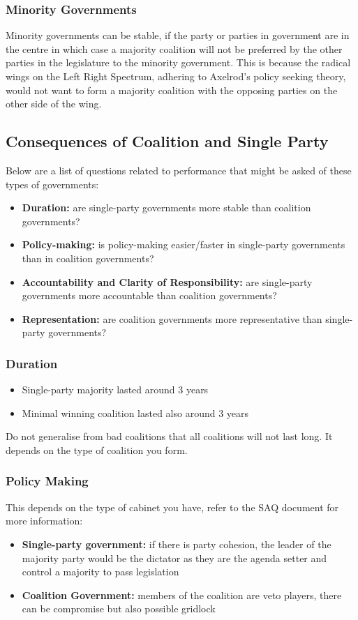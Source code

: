 \documentclass[12pt, letterpaper]{article}
\begin{document}
\subsubsection{Minority Governments}
Minority governments can be stable, if the party or parties in government are in the centre in which case a majority coalition will not be preferred by the other parties in the legislature to the minority government. This is because the radical wings on the Left Right Spectrum, adhering to Axelrod's policy seeking theory, would not want to form a majority coalition with the opposing parties on the other side of the wing.

\subsection{Consequences of Coalition and Single Party}
Below are a list of questions related to performance that might be asked of these types of governments:
\begin{itemize}
	\item \textbf{Duration:} are single-party governments more stable than coalition governments?
	\item \textbf{Policy-making:} is policy-making easier/faster in single-party governments than in coalition governments?
	\item \textbf{Accountability and Clarity of Responsibility:} are single-party governments more accountable than coalition governments?
	\item \textbf{Representation:} are coalition governments more representative than single-party governments?
\end{itemize}

\subsubsection{Duration}
\begin{itemize}
	\item Single-party majority lasted around 3 years
	\item Minimal winning coalition lasted also around 3 years
\end{itemize}
Do not generalise from bad coalitions that all coalitions will not last long. It depends on the type of coalition you form.

\subsubsection{Policy Making}
This depends on the type of cabinet you have, refer to the SAQ document for more information:
\begin{itemize}
	\item \textbf{Single-party government:} if there is party cohesion, the leader of the majority party would be the dictator as they are the agenda setter and control a majority to pass legislation
	\item \textbf{Coalition Government:} members of the coalition are veto players, there can be compromise but also possible gridlock
\end{itemize}
\end{document}

